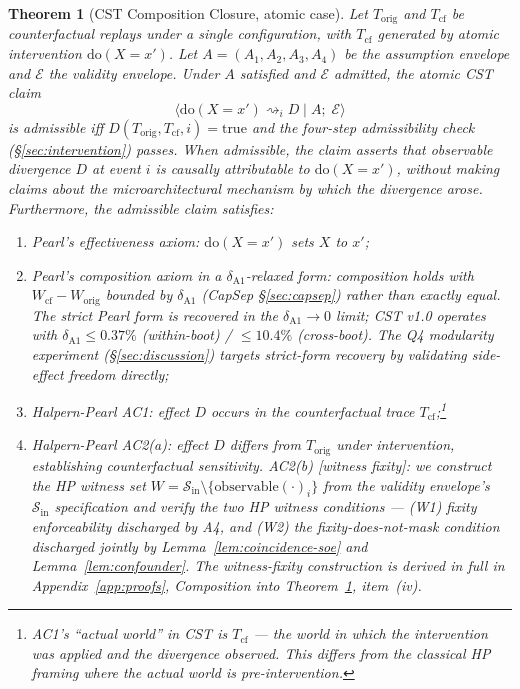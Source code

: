 \documentclass[conference]{IEEEtran}
\newtheorem{theorem}{Theorem}
\newcommand{\Korig}{T_\text{orig}}
\newcommand{\Tcf}{T_\text{cf}}
\newcommand{\dox}[1]{\text{do}(X{=}#1)}
\begin{document}
\begin{theorem}[CST Composition Closure, atomic case]
\label{thm:cst}
Let $\Korig$ and $\Tcf$ be counterfactual replays under a single
configuration, with $\Tcf$ generated by atomic intervention
$\dox{x'}$. Let $A = (A_1, A_2, A_3, A_4)$ be the assumption envelope
and $\mathcal{E}$ the validity envelope. Under $A$ satisfied and
$\mathcal{E}$ admitted, the atomic CST claim
$$\big\langle \dox{x'} \rightsquigarrow_i D \;\big|\;
A;\;\mathcal{E} \big\rangle$$
is \emph{admissible} iff $D(\Korig, \Tcf, i) = \text{true}$ and the
four-step admissibility check (\S\ref{sec:intervention}) passes.
When admissible, the claim asserts that observable divergence $D$ at
event $i$ is causally attributable to $\dox{x'}$, without making
claims about the microarchitectural mechanism by which the
divergence arose. Furthermore, the admissible claim satisfies:
\begin{enumerate}[label=(\roman*)]
\item Pearl's effectiveness axiom: $\dox{x'}$ sets $X$ to $x'$;
\item Pearl's composition axiom in a $\delta_{\text{A1}}$-relaxed
  form: composition holds with $W_\text{cf} - W_\text{orig}$
  bounded by $\delta_{\text{A1}}$ (CapSep \S\ref{sec:capsep}) rather
  than exactly equal. The strict Pearl form is recovered in the
  $\delta_{\text{A1}} \to 0$ limit; CST v1.0 operates with
  $\delta_{\text{A1}} \leq 0.37\%$ (within-boot) /
  $\leq 10.4\%$ (cross-boot). The Q4 modularity experiment
  (\S\ref{sec:discussion}) targets strict-form recovery by
  validating side-effect freedom directly;
\item Halpern-Pearl AC1: effect $D$ occurs in the counterfactual
  trace $\Tcf$;\footnote{AC1's ``actual world'' in CST is $\Tcf$ ---
  the world in which the intervention was applied and the divergence
  observed. This differs from the classical HP framing where the
  actual world is pre-intervention.}
\item Halpern-Pearl AC2(a): effect $D$ differs from $\Korig$ under
  intervention, establishing counterfactual sensitivity. AC2(b)
  [witness fixity]: we construct the HP witness set
  $W = \mathcal{S}_\text{in} \setminus \{\text{observable}(\cdot)_i\}$
  from the validity envelope's $\mathcal{S}_\text{in}$ specification
  and verify the two HP witness conditions --- (W1) fixity
  enforceability discharged by A4, and (W2) the
  fixity-does-not-mask condition discharged jointly by
  Lemma~\ref{lem:coincidence-soe} and
  Lemma~\ref{lem:confounder}. The witness-fixity construction is
  derived in full in Appendix~\ref{app:proofs}, Composition into
  Theorem~\ref{thm:cst}, item~(iv).
\end{enumerate}
\end{theorem}
\end{document}
